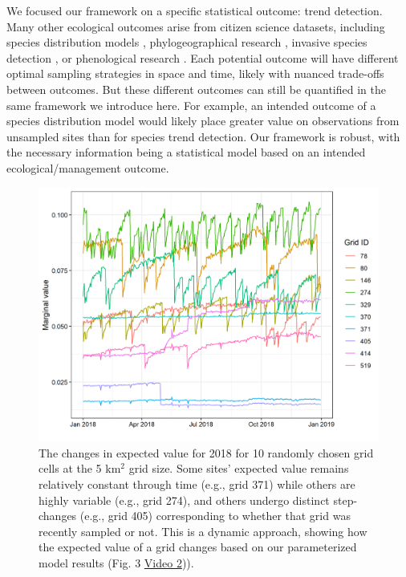 \documentclass[9pt,twocolumn,twoside,lineno]{pnas-new}
\begin{document}
We focused our framework on a specific statistical outcome: trend detection. Many other ecological outcomes arise from citizen science datasets, including species distribution models \cite{bradsworth2017species, van2013opportunistic}, phylogeographical research \cite{bahls2014new, drury2019continent}, invasive species detection \cite{pocock2017citizen, grason2018citizen}, or phenological research \cite{la2014role, supp2015citizen}. Each potential outcome will have different optimal sampling strategies in space and time, likely with nuanced trade-offs between outcomes. But these different outcomes can still be quantified in the same framework we introduce here. For example, an intended outcome of a species distribution model would likely place greater value on observations from unsampled sites \cite{crawley2001scale} than for species trend detection. Our framework is robust, with the necessary information being a statistical model based on an intended ecological/management outcome.

\begin{figure}[!hb]
\centering
\includegraphics[width=.8\linewidth]{example_grids_through_time.png}
\caption{The changes in expected value for 2018 for 10 randomly chosen grid cells at the 5 km$^{2}$ grid size. Some sites' expected value remains relatively constant through time (e.g., grid 371) while others are highly variable (e.g., grid 274), and others undergo distinct step-changes (e.g., grid 405) corresponding to whether that grid was recently sampled or not. This is a dynamic approach, showing how the expected value of a grid changes based on our parameterized model results (Fig. 3 \href{https://github.com/coreytcallaghan/optimize_citizen_science_obs/blob/master/Figures/dynamic_map.gif}{Video 2})).}
\label{fig4}
\end{figure}
\end{document}
